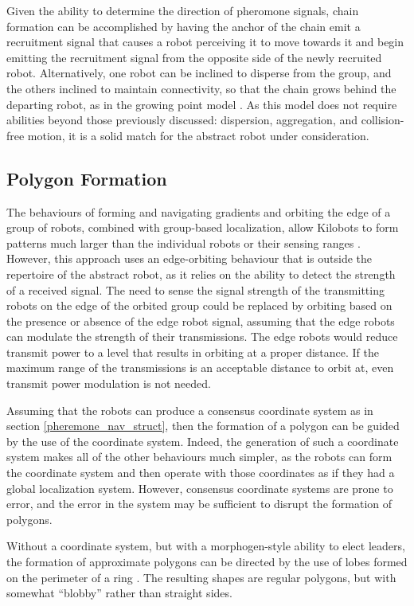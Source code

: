 \documentclass[]{article}
\begin{document}
Given the ability to determine the direction of pheromone signals, chain formation can be accomplished by having the anchor of the chain emit a recruitment signal that causes a robot perceiving it to move towards it and begin emitting the recruitment signal from the opposite side of the newly recruited robot.
Alternatively, one robot can be inclined to disperse from the group, and the others inclined to maintain connectivity, so that the chain grows behind the departing robot, as in the growing point model \cite{payton2001pheromone}.
As this model does not require abilities beyond those previously discussed: dispersion, aggregation, and collision-free motion, it is a solid match for the abstract robot under consideration.

\subsection{Polygon Formation}

The behaviours of forming and navigating gradients and orbiting the edge of a group of robots, combined with group-based localization, allow Kilobots to form patterns much larger than the individual robots or their sensing ranges \cite{Rubenstein795}.
However, this approach uses an edge-orbiting behaviour that is outside the repertoire of the abstract robot, as it relies on the ability to detect the strength of a received signal. 
The need to sense the signal strength of the transmitting robots on the edge of the orbited group could be replaced by orbiting based on the presence or absence of the edge robot signal, assuming that the edge robots can modulate the strength of their transmissions. 
The edge robots would reduce transmit power to a level that results in orbiting at a proper distance. 
If the maximum range of the transmissions is an acceptable distance to orbit at, even transmit power modulation is not needed. 

Assuming that the robots can produce a consensus coordinate system as in section \ref{pheremone_nav_struct}, then the formation of a polygon can be guided by the use of the coordinate system.
Indeed, the generation of such a coordinate system makes all of the other behaviours much simpler, as the robots can form the coordinate system and then operate with those coordinates as if they had a global localization system.
However, consensus coordinate systems are prone to error, and the error in the system may be sufficient to disrupt the formation of polygons. 

Without a coordinate system, but with a morphogen-style ability to elect leaders, the formation of approximate polygons can be directed by the use of lobes formed on the perimeter of a ring \cite{mamei2004experiments}. 
The resulting shapes are regular polygons, but with somewhat ``blobby'' rather than straight sides. 
\end{document}
